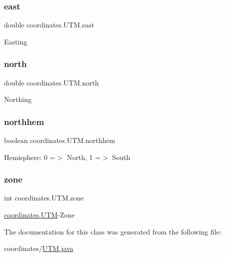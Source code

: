 \subsubsection{\texorpdfstring{east}{east}}
{\footnotesize\ttfamily double coordinates.\+U\+T\+M.\+east\hspace{0.3cm}{\ttfamily [private]}}

Easting \mbox{\label{classcoordinates_1_1_u_t_m_a74bc382b61e98b1438c07e101de460e9}} 
\subsubsection{\texorpdfstring{north}{north}}
{\footnotesize\ttfamily double coordinates.\+U\+T\+M.\+north\hspace{0.3cm}{\ttfamily [private]}}

Northing \mbox{\label{classcoordinates_1_1_u_t_m_adb335a29a61081a69f82fb18047b2533}} 
\subsubsection{\texorpdfstring{northhem}{northhem}}
{\footnotesize\ttfamily boolean coordinates.\+U\+T\+M.\+northhem\hspace{0.3cm}{\ttfamily [private]}}

Hemisphere\+: 0 =$>$ North, 1 =$>$ South \mbox{\label{classcoordinates_1_1_u_t_m_a895d50db8cc3e81cb4d8ec1142a6939d}} 
\subsubsection{\texorpdfstring{zone}{zone}}
{\footnotesize\ttfamily int coordinates.\+U\+T\+M.\+zone\hspace{0.3cm}{\ttfamily [private]}}

\hyperlink{classcoordinates_1_1_u_t_m}{coordinates.\+U\+TM}-\/\+Zone 

The documentation for this class was generated from the following file\+:\begin{DoxyCompactItemize}
\item 
coordinates/\hyperlink{_u_t_m_8java}{U\+T\+M.\+java}\end{DoxyCompactItemize}
